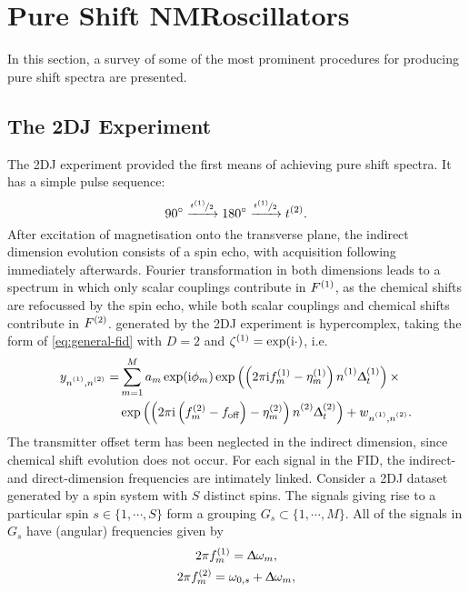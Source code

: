 \section{Pure Shift NMRoscillators}

In this section, a survey of some of the most prominent procedures for
producing pure shift spectra are presented.

\subsection{The \acl{2DJ} Experiment}
The \ac{2DJ} experiment\cite{Aue1976, Morris2009} provided the first means of
achieving pure shift spectra. It has a simple pulse sequence:
\[
    \ang{90} \xrightarrow{\nicefrac{t^{(1)}}{2}} \ang{180} \xrightarrow{\nicefrac{t^{(1)}}{2}} t^{(2)}.
\]
After excitation of magnetisation onto the transverse plane, the indirect
dimension evolution consists of a spin echo, with acquisition following
immediately afterwards. Fourier transformation in both dimensions leads to a
spectrum in which only scalar couplings contribute in $F^{(1)}$, as the chemical
shifts are refocussed by the spin echo, while both scalar couplings and
chemical shifts contribute in $F^{(2)}$.   generated by the \ac{2DJ}
experiment is hypercomplex, taking the form of \eqref{eq:general-fid} with
$D=2$ and $\zeta^{(1)} = \exp(\mathrm{i}\cdot)$, i.e.
\begin{equation}%
    \begin{split}%
        y_{\none,\ntwo} =
        &\sum_{m=1}^{M} a_m \exp(\iu \phi_m)
            \exp\left(\left(2 \pi \iu \fonem - \etaonem\right) \none \Dtone\right) \times \\
        &\exp\left(\left(2 \pi \iu  \left(\ftwom - \foff\right)
            - \etatwom\right) \ntwo \Dttwo\right)
            + w_{\none,\ntwo}.
    \end{split}%
    \label{eq:jres-fid}
\end{equation}%
The transmitter offset term has been neglected in the indirect dimension, since
chemical shift evolution does not occur.
For each signal in the \ac{FID}, the indirect- and direct-dimension
frequencies are intimately linked. Consider a \ac{2DJ} dataset generated by a
spin system with $S$ distinct spins. The signals giving rise to a particular
spin $s \in \lbrace 1, \cdots, S \rbrace$ form a grouping $G_s
\subset \lbrace 1, \cdots, M \rbrace$. All of the signals in $G_s$
have (angular) frequencies given by
\begin{subequations}
    \begin{gather}
        2 \pi f_m^{(1)} = \Updelta \omega_m,\\
        2 \pi f_m^{(2)} = \omega_{0,s} + \Updelta \omega_m,
    \end{gather}
    \label{eq:f1-f2-2dj}
\end{subequations}
